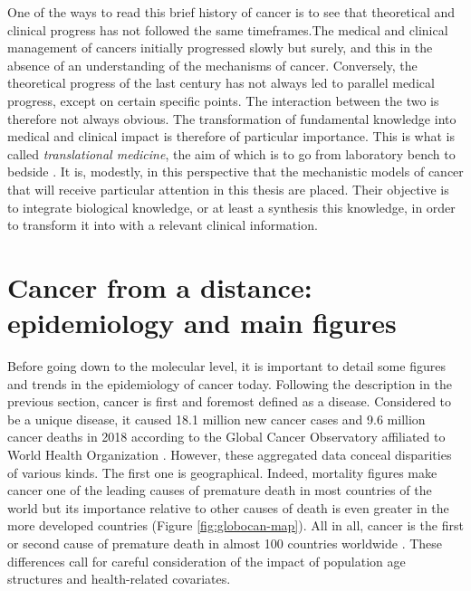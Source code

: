 \documentclass[a4paper,12pt,twoside,onecolumn,openright,final,oldfontcommands]{memoir}
\begin{document}
One of the ways to read this brief history of cancer is to see that
theoretical and clinical progress has not followed the same
timeframes.The medical and clinical management of cancers initially
progressed slowly but surely, and this in the absence of an
understanding of the mechanisms of cancer. Conversely, the theoretical
progress of the last century has not always led to parallel medical
progress, except on certain specific points. The interaction between the
two is therefore not always obvious. The transformation of fundamental
knowledge into medical and clinical impact is therefore of particular
importance. This is what is called \emph{translational medicine}, the
aim of which is to go from laboratory bench to bedside
\citep{cohrs2015translational}. It is, modestly, in this perspective
that the mechanistic models of cancer that will receive particular
attention in this thesis are placed. Their objective is to integrate
biological knowledge, or at least a synthesis this knowledge, in order
to transform it into with a relevant clinical information.

\section{Cancer from a distance: epidemiology and main
figures}\label{epidemio}

Before going down to the molecular level, it is important to detail some
figures and trends in the epidemiology of cancer today. Following the
description in the previous section, cancer is first and foremost
defined as a disease. Considered to be a unique disease, it caused 18.1
million new cancer cases and 9.6 million cancer deaths in 2018 according
to the Global Cancer Observatory affiliated to World Health Organization
\citep{bray2018global}. However, these aggregated data conceal
disparities of various kinds. The first one is geographical. Indeed,
mortality figures make cancer one of the leading causes of premature
death in most countries of the world but its importance relative to
other causes of death is even greater in the more developed countries
(Figure \ref{fig:globocan-map}). All in all, cancer is the first or
second cause of premature death in almost 100 countries worldwide
\citep{bray2018global}. These differences call for careful consideration
of the impact of population age structures and health-related
covariates.
\end{document}
